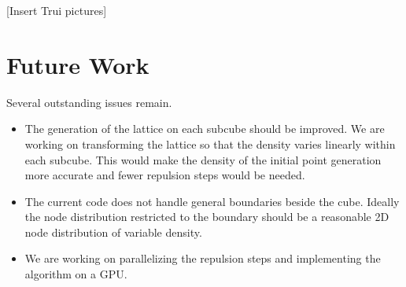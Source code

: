 \documentclass[10pt]{amsart}
\begin{document}
[Insert Trui pictures]





\section{Future Work}

Several outstanding issues remain. 
\begin{itemize}
\item The generation of the lattice on each subcube should be improved. We are working on transforming the lattice so that the density varies linearly within each subcube. This would make the density of the initial point generation more accurate and fewer repulsion steps would be needed.
\item The current code does not handle general boundaries beside the cube. Ideally the node distribution restricted to the boundary should be a reasonable 2D node distribution of variable density.
\item We are working on parallelizing the repulsion steps and implementing the algorithm on a GPU. \cite{Recipes1989}
\end{itemize}



\end{document}
